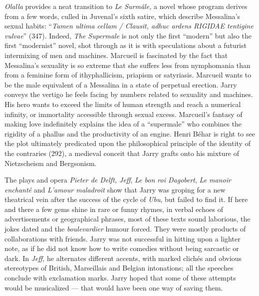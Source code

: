 \begin{review}
\emph{Olalla} provides a neat transition to \emph{Le Surmâle,} a novel
whose program derives from a few words, culled in Juvenal's sixth satire,
which describe Messalina’s sexual habits: ``\emph{Tamen ultima cellam / Clausit,
adhuc ardens RIGIDAE tentigine vulvae}'' (347). Indeed,
\emph{The Supermale} is not only the first ``modern'' but also the first
``modernist'' novel, shot through as it is with speculations about a
futurist intermixing of men and machines. Marcueil is fascinated by the
fact that Messalina's sexuality is so extreme that she suffers less from
nymphomania than from a feminine form of ithyphallicism, priapism or
satyriasis. Marcueil wants to be the male equivalent of a Messalina in a
state of perpetual erection. Jarry conveys the vertigo he feels facing
by numbers related to sexuality and machines. His hero wants to exceed
the limits of human strength and reach a numerical infinity, or
immortality accessible through sexual excess. Marcueil's fantasy of
making love indefinitely explains the idea of a ``supermale'' who
combines the rigidity of a phallus and the productivity of an engine.
Henri Béhar is right to see the plot ultimately predicated upon the
philosophical principle of the identity of the contraries (292), a
medieval conceit that Jarry grafts onto his mixture of Nietzscheism and
Bergsonism.

The plays and opera \emph{Pieter de Delft, Jeff}, \emph{Le bon roi
Dagobert}, \emph{Le manoir enchanté} and \emph{L'amour maladroit} show
that Jarry was groping for a new theatrical vein after the success of
the cycle of \emph{Ubu}, but failed to find it. If here and there a few
gems shine in rare or funny rhymes, in verbal echoes of advertisements
or geographical phrases, most of these texts sound laborious, the jokes
dated and the \emph{boulevardier} humour forced. They were mostly
products of collaborations with friends. Jarry was not successful in
hitting upon a lighter note, as if he did not know how to write comedies
without being sarcastic or dark. In \emph{Jeff,} he alternates different
accents, with marked clichés and obvious stereotypes of British,
Marseillais and Belgian intonations; all the speeches conclude with
exclamation marks. Jarry hoped that some of these attempts would be
musicalized –– that would have been one way of saving them.


\end{review}
